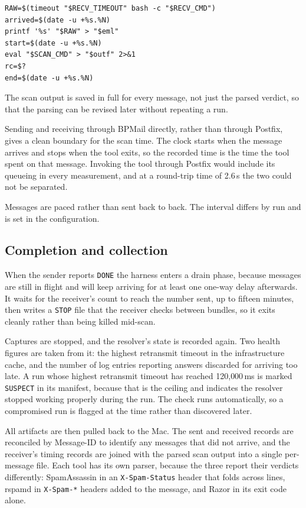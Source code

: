 \begin{lstlisting}
RAW=$(timeout "$RECV_TIMEOUT" bash -c "$RECV_CMD")
arrived=$(date -u +%s.%N)
printf '%s' "$RAW" > "$eml"
start=$(date -u +%s.%N)
eval "$SCAN_CMD" > "$outf" 2>&1
rc=$?
end=$(date -u +%s.%N)
\end{lstlisting}

The scan output is saved in full for every message, not just the parsed verdict, so
that the parsing can be revised later without repeating a run.

Sending and receiving through BPMail directly, rather than through Postfix, gives a
clean boundary for the scan time. The clock starts when the message arrives and stops
when the tool exits, so the recorded time is the time the tool spent on that message.
Invoking the tool through Postfix would include its queueing in every measurement,
and at a round-trip time of 2.6\,s the two could not be separated.

Messages are paced rather than sent back to back. The interval differs by run and is
set in the configuration.

\subsection{Completion and collection}

When the sender reports \texttt{DONE} the harness enters a drain phase, because
messages are still in flight and will keep arriving for at least one one-way delay
afterwards. It waits for the receiver's count to reach the number sent, up to fifteen
minutes, then writes a \texttt{STOP} file that the receiver checks between bundles, so it exits cleanly rather than being killed mid-scan.

Captures are stopped, and the resolver's state is recorded again. Two health figures
are taken from it: the highest retransmit timeout in the infrastructure cache, and
the number of log entries reporting answers discarded for arriving too late. A run
whose highest retransmit timeout has reached 120{,}000\,ms is marked
\texttt{SUSPECT} in its manifest, because that is the ceiling and indicates the
resolver stopped working properly during the run. The check runs automatically, so a compromised run is flagged at the time rather than discovered later.

All artifacts are then pulled back to the Mac. The sent and received records are
reconciled by Message-ID to identify any messages that did not arrive, and the
receiver's timing records are joined with the parsed scan output into a single
per-message file. Each tool has its own parser, because the three report their
verdicts differently: SpamAssassin in an \texttt{X-Spam-Status} header that folds
across lines, rspamd in \texttt{X-Spam-*} headers added to the message, and Razor in
its exit code alone.

